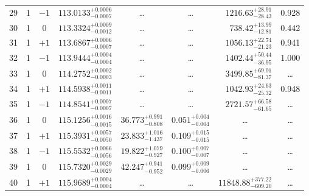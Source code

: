 \begin{table*}[!]
\begin{tabular}{llcrrlrc}
29 & 1 & $-1$ & $    113.0133_{-      0.0007}^{+      0.0006}$ & \multicolumn{1}{c}{\dots} & \multicolumn{1}{c}{\dots} & $     1216.63_{-       28.43}^{+       28.91}$ & 0.928\\[1pt]
30 & 1 & 0 & $    113.3324_{-      0.0012}^{+      0.0009}$ & \multicolumn{1}{c}{\dots} & \multicolumn{1}{c}{\dots} & $      738.42_{-       12.81}^{+       13.99}$ & 0.442\\[1pt]
31 & 1 & $+1$ & $    113.6867_{-      0.0007}^{+      0.0006}$ & \multicolumn{1}{c}{\dots} & \multicolumn{1}{c}{\dots} & $     1056.13_{-       21.23}^{+       22.74}$ & 0.941\\[1pt]
32 & 1 & $-1$ & $    113.9444_{-      0.0004}^{+      0.0004}$ & \multicolumn{1}{c}{\dots} & \multicolumn{1}{c}{\dots} & $     1402.44_{-       36.95}^{+       50.44}$ & 1.000\\[1pt]
33 & 1 & 0 & $    114.2752_{-      0.0003}^{+      0.0002}$ & \multicolumn{1}{c}{\dots} & \multicolumn{1}{c}{\dots} & $     3499.85_{-       81.37}^{+       69.01}$ & \dots \\[1pt]
34 & 1 & $+1$ & $    114.5938_{-      0.0011}^{+      0.0011}$ & \multicolumn{1}{c}{\dots} & \multicolumn{1}{c}{\dots} & $     1042.93_{-       25.32}^{+       24.63}$ & 0.948\\[1pt]
35 & 1 & $-1$ & $    114.8541_{-      0.0007}^{+      0.0007}$ & \multicolumn{1}{c}{\dots} & \multicolumn{1}{c}{\dots} & $     2721.57_{-       61.65}^{+       66.58}$ & \dots \\[1pt]
36 & 1 & 0 & $    115.1256_{-      0.0015}^{+      0.0016}$ & $      36.773_{-       0.808}^{+       0.991}$ & $       0.051_{-       0.004}^{+       0.004}$ & \multicolumn{1}{c}{\dots} & \dots \\[1pt]
37 & 1 & $+1$ & $    115.3931_{-      0.0050}^{+      0.0057}$ & $      23.833_{-       1.437}^{+       1.016}$ & $       0.109_{-       0.015}^{+       0.015}$ & \multicolumn{1}{c}{\dots} & \dots \\[1pt]
38 & 1 & $-1$ & $    115.5532_{-      0.0056}^{+      0.0066}$ & $      19.822_{-       0.927}^{+       1.079}$ & $       0.100_{-       0.007}^{+       0.007}$ & \multicolumn{1}{c}{\dots} & \dots \\[1pt]
39 & 1 & 0 & $    115.7320_{-      0.0029}^{+      0.0029}$ & $      42.247_{-       0.952}^{+       0.941}$ & $       0.099_{-       0.006}^{+       0.009}$ & \multicolumn{1}{c}{\dots} & \dots \\[1pt]
40 & 1 & $+1$ & $    115.9689_{-      0.0004}^{+      0.0004}$ & \multicolumn{1}{c}{\dots} & \multicolumn{1}{c}{\dots} & $    11848.88_{-      609.20}^{+      377.22}$ & \dots \\[1pt]

\end{tabular}
\end{table*}
